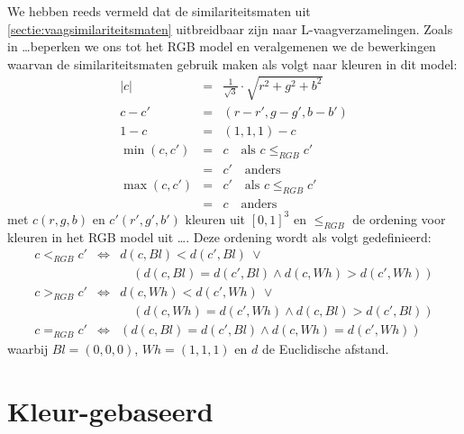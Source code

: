 We hebben reeds vermeld dat de similariteitsmaten uit \ref{sectie:vaagsimilariteitsmaten}
uitbreidbaar zijn naar L-vaag\-ver\-za\-me\-ling\-en. Zoals in \ldots beperken we ons tot het 
RGB model en veralgemenen we de be\-wer\-king\-en waarvan de similariteitsmaten gebruik maken 
als volgt naar kleuren in dit model:
$$
\begin{array}{rcl}
|c| & = & \frac{1}{\sqrt{3}} \cdot \sqrt{r^2 + g^2 + b^2} \\[5pt]
c - c' & = & (r-r',g-g',b-b') \\[5pt]
1 - c & = & (1,1,1) - c \\[5pt]
\min (c,c') & = & c \quad\textrm{als } c \leq_{RGB} c' \\
		  & = & c' \quad\textrm{anders} \\[5pt]
\max (c,c') & = & c' \quad\textrm{als } c \leq_{RGB} c' \\
		  & = & c \quad\textrm{anders}
\end{array}
$$
met $c(r,g,b)$ en $c'(r',g',b')$ kleuren uit $[0,1]^3$ en $\leq_{RGB}$ de ordening voor
kleuren in het RGB model uit \ldots. Deze ordening wordt als volgt gedefinieerd:
$$
\begin{array}{rcl}
c <_{RGB} c' & \iff & d(c,Bl) < d(c',Bl)\ \lor \\
			   &	  & \quad(d(c,Bl) = d(c',Bl) \land d(c,Wh) > d(c',Wh)) \\[5pt]
c >_{RGB} c' & \iff & d(c,Wh) < d(c',Wh)\ \lor \\
			   &	  & \quad(d(c,Wh) = d(c',Wh) \land d(c,Bl) > d(c',Bl)) \\[5pt]
c =_{RGB} c'   & \iff & (d(c,Bl) = d(c',Bl) \land d(c,Wh) = d(c',Wh))
\end{array}
$$
waarbij $Bl=(0,0,0)$, $Wh=(1,1,1)$ en $d$ de Euclidische afstand.

\section{Kleur-gebaseerd}
